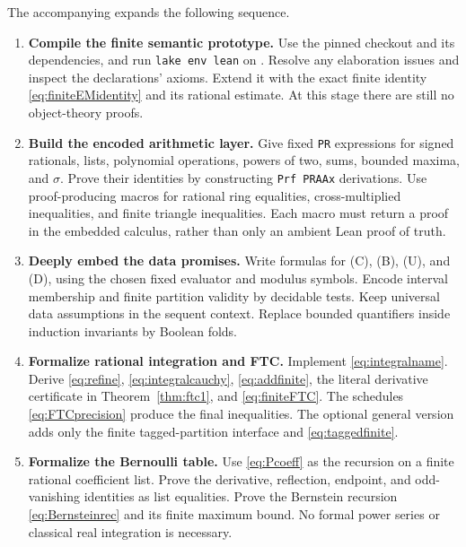 \documentclass[11pt]{article}
\theoremstyle{definition}
\newcommand{\code}[1]{\texttt{#1}}
\begin{document}
The accompanying  expands the following sequence.

\begin{enumerate}
\item \textbf{Compile the finite semantic prototype.}
Use the pinned checkout and its dependencies, and run
\code{lake env lean} on .  Resolve any
elaboration issues and inspect the declarations' axioms.  Extend it
with the exact finite identity \eqref{eq:finiteEMidentity} and its
rational estimate.  At this stage there are still no object-theory
proofs.

\item \textbf{Build the encoded arithmetic layer.}
Give fixed \code{PR} expressions for signed rationals, lists,
polynomial operations, powers of two, sums, bounded maxima, and
\(\sigma\).  Prove their identities by constructing
\code{Prf PRAAx} derivations.  Use proof-producing macros for
rational ring equalities, cross-multiplied inequalities, and finite
triangle inequalities.  Each macro must return a proof in the
embedded calculus, rather than only an ambient Lean proof of truth.

\item \textbf{Deeply embed the data promises.}
Write formulas for (C), (B), (U), and (D), using the chosen fixed
evaluator and modulus symbols.  Encode interval membership and finite
partition validity by decidable tests.  Keep universal data assumptions
in the sequent context.  Replace bounded quantifiers inside induction
invariants by Boolean folds.

\item \textbf{Formalize rational integration and FTC.}
Implement \eqref{eq:integralname}.  Derive
\eqref{eq:refine}, \eqref{eq:integralcauchy},
\eqref{eq:addfinite}, the literal derivative certificate in
Theorem~\ref{thm:ftc1}, and \eqref{eq:finiteFTC}.
The schedules \eqref{eq:FTCprecision} produce the final inequalities.
The optional general version adds only the finite tagged-partition
interface and \eqref{eq:taggedfinite}.

\item \textbf{Formalize the Bernoulli table.}
Use \eqref{eq:Pcoeff} as the recursion on a finite rational coefficient
list.  Prove the derivative, reflection, endpoint, and odd-vanishing
identities as list equalities.  Prove the Bernstein recursion
\eqref{eq:Bernsteinrec} and its finite maximum bound.  No formal power
series or classical real integration is necessary.


\end{enumerate}
\end{document}
